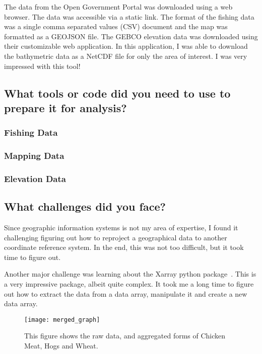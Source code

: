 The data from the Open Government Portal was downloaded using a web browser.
The data was accessible via a static link.
The format of the fishing data was a single comma separated values (CSV) document and the map was formatted as a GEOJSON file.
The GEBCO elevation data was downloaded using their customizable web application.
In this application, I was able to download the bathymetric data as a NetCDF file for only the area of interest.
I was very impressed with this tool!


\subsection{What tools or code did you need to use to prepare it for analysis?}


\subsubsection{Fishing Data}



\subsubsection{Mapping Data}



\subsubsection{Elevation Data}



\subsection{What challenges did you face?}

Since geographic information systems is not my area of expertise, I found it challenging figuring out how to reproject a geographical data to another
coordinate reference system.
In the end, this was not too difficult, but it took time to figure out.

Another major challenge was learning about the Xarray python package~\cite{xarray}.
This is a very impressive package, albeit quite complex.
It took me a long time to figure out how to extract the data from a data array, manipulate it and create a new data array.





\begin{figure}
    \texttt{[image: merged\_graph]}
    \caption{This figure shows the raw data, and aggregated forms of Chicken Meat, Hogs and Wheat.}
    \label{fig:chicken_prices}
\end{figure}

